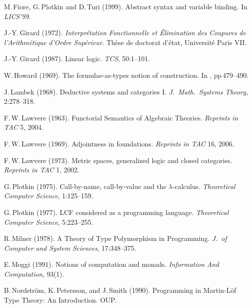 \documentclass[11pt,twocolumn]{article}
\begin{document}
{\begin{thebibliography}{00}
M.\,Fiore, G.\,Plotkin and D.\,Turi (1999). 
\newblock Abstract syntax and variable binding.
\newblock In \emph{LICS'99}.

J.-Y.\,Girard (1972).
\newblock \emph{Interpr\'{e}tation Fonctionnelle et \'{E}li\-mi\-na\-tion des
  Coupures de l'Arithm\'{e}tique d'Ordre Sup\'{e}rieur}.
\newblock Th\`{e}se de doctorat d'\'{e}tat, Universit\'{e} Paris VII. 

J.-Y.\,Girard (1987).
\newblock Linear logic.
\newblock \emph{TCS}, 50:1--101.

W.\,Howard (1969).
\newblock The formulae-as-types notion of construction.
\newblock In \emph{\cite{ToHBCurry}}, pp\,479--490. 

J.\,Lambek (1968).
\newblock Deductive systems and categories I.
\newblock \emph{J.\ Math.\ Systems Theory}, 2:278--318.

F.\,W.\,Lawvere (1963). %
\newblock Functorial Semantics of Algebraic Theories. %
\newblock \emph{Reprints in TAC} 5, 2004.

F.\,W.\,Lawvere (1969).
\newblock Adjointness in foundations.
\newblock \emph{Reprints in TAC} 16, 2006.

F.\,W.\,Lawvere (1973).
\newblock Metric spaces, generalized logic and closed categories.
\newblock \emph{Reprints in TAC} 1, 2002.

G.\,Plotkin (1975).
\newblock Call-by-name, call-by-value and the \mbox{$\lambda$-calculus}.
\newblock \emph{Theoretical Computer Science}, 1:125--159.

G.\,Plotkin (1977).
\newblock LCF considered as a programming language.
\newblock \emph{Theoretical Computer Science}, 5:223--255.

R.\,Milner (1978).
\newblock A Theory of Type Polymorphism in Programming.
\newblock \emph{J.\ of Computer and System Sciences}, 17:348--375.

E.\,Moggi (1991).
\newblock Notions of computation and monads. 
\newblock \emph{Information And Computation}, 93(1).

B.\,Nordstr\"om, K.\,Petersson, and J.\,Smith (1990).
\newblock Programming in Martin-L\"of Type Theory: An Introduction.
\newblock OUP.


\end{thebibliography}}
\end{document}

